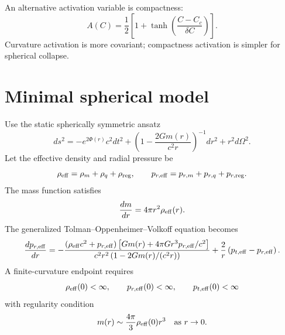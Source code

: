 \documentclass[11pt]{article}
\theoremstyle{remark}
\begin{document}
An alternative activation variable is compactness:
\begin{equation}
    A(C)=\frac{1}{2}\left[1+\tanh\left(\frac{C-C_c}{\delta C}\right)\right].
\end{equation}
Curvature activation is more covariant; compactness activation is simpler for spherical collapse.

\section{Minimal spherical model}
Use the static spherically symmetric ansatz
\begin{equation}
    ds^2=-e^{2\Phi(r)}c^2dt^2+\left(1-\frac{2Gm(r)}{c^2r}\right)^{-1}dr^2+r^2d\Omega^2.
\end{equation}
Let the effective density and radial pressure be
\begin{equation}
    \rho_{\rm eff}=\rho_m+\rho_q+\rho_{\rm reg},
    \qquad
    p_{r,\rm eff}=p_{r,m}+p_{r,q}+p_{r,\rm reg}.
\end{equation}
The mass function satisfies
\begin{equation}
    \frac{dm}{dr}=4\pi r^2\rho_{\rm eff}(r).
\end{equation}
The generalized Tolman--Oppenheimer--Volkoff equation becomes
\begin{equation}
    \frac{dp_{r,\rm eff}}{dr}
    = -\frac{(\rho_{\rm eff}c^2+p_{r,\rm eff})
    \left[Gm(r)+4\pi G r^3p_{r,\rm eff}/c^2\right]}
    {c^2r^2\left(1-2Gm(r)/(c^2r)\right)}
    + \frac{2}{r}\left(p_{t,\rm eff}-p_{r,\rm eff}\right).
\end{equation}
A finite-curvature endpoint requires
\begin{equation}
    \rho_{\rm eff}(0)<\infty,
    \qquad
    p_{r,\rm eff}(0)<\infty,
    \qquad
    p_{t,\rm eff}(0)<\infty
\end{equation}
with regularity condition
\begin{equation}
    m(r)\sim \frac{4\pi}{3}\rho_{\rm eff}(0)r^3
    \quad \text{as } r\to 0.
\end{equation}
\end{document}
